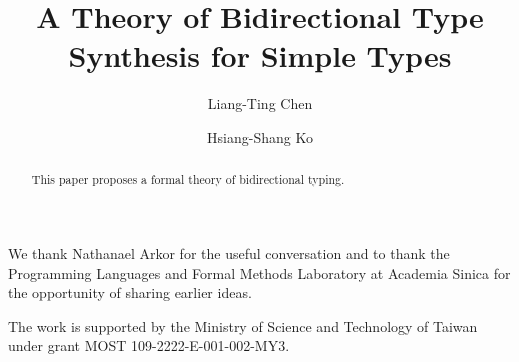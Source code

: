 \documentclass[acmsmall,screen]{acmart}
\theoremstyle{acmdefinition}
\begin{document}
\author{Liang-Ting Chen}
\author{Hsiang-Shang Ko}


\title{A Theory of Bidirectional Type Synthesis for Simple Types}

\begin{abstract}
  This paper proposes a formal theory of bidirectional typing.
\end{abstract}

\maketitle









\begin{acks}
We thank Nathanael Arkor for the useful conversation and to thank the Programming Languages and Formal Methods Laboratory at Academia Sinica for the opportunity of sharing earlier ideas.

The work is supported by the Ministry of Science and Technology of Taiwan under grant MOST 109-2222-E-001-002-MY3.
\end{acks}



\end{document}
